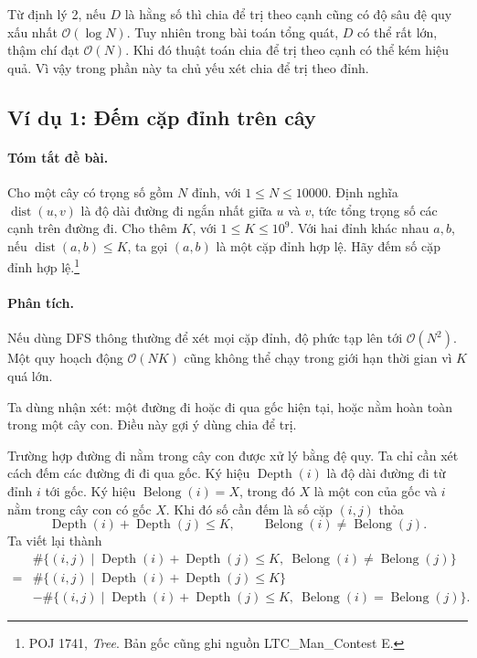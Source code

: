 \documentclass[11pt]{article}
\newcommand{\Oh}{\mathcal{O}}
\newcommand{\dist}{\operatorname{dist}}
\newcommand{\Depth}{\operatorname{Depth}}
\newcommand{\Belong}{\operatorname{Belong}}
\begin{document}
Từ định lý 2, nếu \(D\) là hằng số thì chia để trị theo cạnh cũng có độ sâu
đệ quy xấu nhất \(\Oh(\log N)\). Tuy nhiên trong bài toán tổng quát, \(D\) có
thể rất lớn, thậm chí đạt \(\Oh(N)\). Khi đó thuật toán chia để trị theo cạnh
có thể kém hiệu quả. Vì vậy trong phần này ta chủ yếu xét chia để trị theo
đỉnh.

\subsection{Ví dụ 1: Đếm cặp đỉnh trên cây}

\paragraph{Tóm tắt đề bài.}
Cho một cây có trọng số gồm \(N\) đỉnh, với \(1\le N\le 10000\). Định nghĩa
\(\dist(u,v)\) là độ dài đường đi ngắn nhất giữa \(u\) và \(v\), tức tổng
trọng số các cạnh trên đường đi. Cho thêm \(K\), với \(1\le K\le 10^9\). Với
hai đỉnh khác nhau \(a,b\), nếu \(\dist(a,b)\le K\), ta gọi \((a,b)\) là một
cặp đỉnh hợp lệ. Hãy đếm số cặp đỉnh hợp lệ.\footnote{POJ 1741,
\textit{Tree}. Bản gốc cũng ghi nguồn LTC\_Man\_Contest E.}

\paragraph{Phân tích.}
Nếu dùng DFS thông thường để xét mọi cặp đỉnh, độ phức tạp lên tới
\(\Oh(N^2)\). Một quy hoạch động \(\Oh(NK)\) cũng không thể chạy trong giới
hạn thời gian vì \(K\) quá lớn.

Ta dùng nhận xét: một đường đi hoặc đi qua gốc hiện tại, hoặc nằm hoàn toàn
trong một cây con. Điều này gợi ý dùng chia để trị.

Trường hợp đường đi nằm trong cây con được xử lý bằng đệ quy. Ta chỉ cần xét
cách đếm các đường đi đi qua gốc. Ký hiệu \(\Depth(i)\) là độ dài đường đi từ
đỉnh \(i\) tới gốc. Ký hiệu \(\Belong(i)=X\), trong đó \(X\) là một con của
gốc và \(i\) nằm trong cây con có gốc \(X\). Khi đó số cần đếm là số cặp
\((i,j)\) thỏa
\[
  \Depth(i)+\Depth(j)\le K,\qquad \Belong(i)\ne \Belong(j).
\]
Ta viết lại thành
\[
\begin{aligned}
&\#\{(i,j)\mid \Depth(i)+\Depth(j)\le K,\ \Belong(i)\ne\Belong(j)\}\\
={}&
\#\{(i,j)\mid \Depth(i)+\Depth(j)\le K\}\\
&-\#\{(i,j)\mid \Depth(i)+\Depth(j)\le K,\ \Belong(i)=\Belong(j)\}.
\end{aligned}
\]
\end{document}
